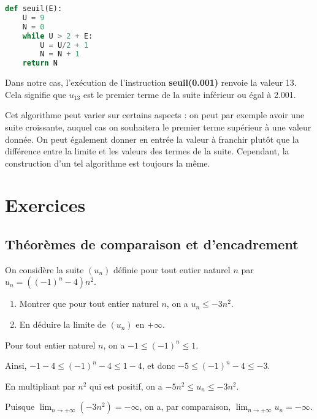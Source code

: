 \documentclass[11pt,fleqn, openany]{book} %
\begin{document}
\begin{example}
\begin{lstlisting}[language=python]
def seuil(E):
	U = 9
	N = 0
	while U > 2 + E:
		U = U/2 + 1
		N = N + 1
	return N
\end{lstlisting}

Dans notre cas, l'exécution de l'instruction \textbf{seuil(0.001)} renvoie la valeur 13. Cela signifie que $u_{13}$ est le premier terme de la suite inférieur ou égal à 2.001.\end{example}

Cet algorithme peut varier sur certains aspects : on peut par exemple avoir une suite croissante, auquel cas on souhaitera le premier terme supérieur à une valeur donnée. On peut également donner en entrée la valeur à franchir plutôt que la différence entre la limite et les valeurs des termes de la suite. Cependant, la construction d'un tel algorithme est toujours la même.

\chapter{Exercices}


\section*{Théorèmes de comparaison et d'encadrement}

\begin{exercise}On considère la suite $(u_n)$ définie pour tout entier naturel $n$ par $u_n=((-1)^n-4)n^2$.
\begin{enumerate}
\item Montrer que pour tout entier naturel $n$, on a $u_n \leqslant -3n^2$.
\item En déduire la limite de $(u_n)$ en $+\infty$.
\end{enumerate}\end{exercise}

\begin{solution}Pour tout entier naturel $n$, on a $-1 \leqslant (-1)^n \leqslant 1$. 

Ainsi, $-1-4 \leqslant (-1)^n -4\leqslant 1-4$, et donc $-5 \leqslant (-1)^n-4 \leqslant -3$.

En multipliant par $n^2$ qui est positif, on a $-5n^2 \leqslant u_n \leqslant -3n^2$.

Puisque $\displaystyle\lim_{n \to + \infty} (-3n^2)=-\infty$, on a, par comparaison, $\displaystyle\lim_{n \to + \infty}u_n=-\infty$.\end{solution}
\end{document}
